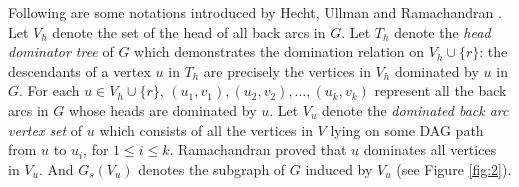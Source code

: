 \documentclass[11pt]{article}
\begin{document}
Following are some notations introduced by Hecht, Ullman \cite{HecU1, HecU2} and Ramachandran \cite{Rama1,Rama2}. Let $V_h$ denote the set of the head of all back arcs in $G$. Let $T_h$ denote the \emph{head dominator tree} of $G$ which demonstrates the domination relation on $V_h\cup \{r\}$: the descendants of a vertex $u$ in $T_h$ are precisely the vertices in $V_h$ dominated by $u$ in $G$. For each $u\in V_h\cup\{r\}$, $(u_1,v_1),(u_2,v_2),\ldots,(u_k,v_k)$ represent all the back arcs in $G$ whose heads are dominated by $u$. Let $V_u$ denote the \emph{dominated back arc vertex set} of $u$ which consists of all the vertices in $V$ lying on some DAG path from $u$ to $u_i$, for $1\leq i\leq k$. Ramachandran \cite{Rama1,Rama2} proved that $u$ dominates all vertices in $V_u$. And $G_s(V_u)$ denotes the subgraph of $G$ induced by $V_u$ (see Figure \ref{fig:2}).
\end{document}
